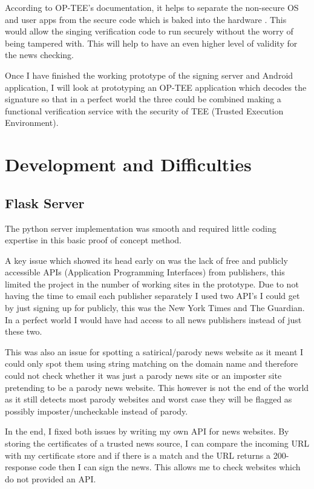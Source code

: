 \documentclass[11pt,a4paper]{report}
\begin{document}
According to OP-TEE’s documentation, it helps to separate the non-secure OS and user apps from the secure code which is baked into the hardware \citep{OP-TEE}. This would allow the singing verification code to run securely without the worry of being tampered with. This will help to have an even higher level of validity for the news checking.

Once I have finished the working prototype of the signing server and Android application, I will look at prototyping an OP-TEE application which decodes the signature so that in a perfect world the three could be combined making a functional verification service with the security of TEE (Trusted Execution Environment).
\newpage
\section{Development and Difficulties}
\subsection{Flask Server}
The python server implementation was smooth and required little coding expertise in this basic proof of concept method.

A key issue which showed its head early on was the lack of free and publicly accessible APIs (Application Programming Interfaces) from publishers, this limited the project in the number of working sites in the prototype. Due to not having the time to email each publisher separately I used two API’s I could get by just signing up for publicly, this was the New York Times and The Guardian. In a perfect world I would have had access to all news publishers instead of just these two.

This was also an issue for spotting a satirical/parody news website as it meant I could only spot them using string matching on the domain name and therefore could not check whether it was just a parody news site or an imposter site pretending to be a parody news website. This however is not the end of the world as it still detects most parody websites and worst case they will be flagged as possibly imposter/uncheckable instead of parody.

In the end, I fixed both issues by writing my own API for news websites. By storing the certificates of a trusted news source, I can compare the incoming URL with my certificate store and if there is a match and the URL returns a 200-response code then I can sign the news. This allows me to check websites which do not provided an API.
\end{document}
